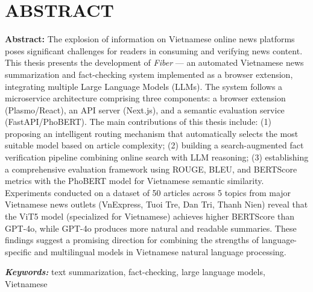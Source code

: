 \chapter*{ABSTRACT}

\textbf{Abstract:} The explosion of information on Vietnamese online news platforms poses significant challenges for readers in consuming and verifying news content. This thesis presents the development of \textit{Fiber} --- an automated Vietnamese news summarization and fact-checking system implemented as a browser extension, integrating multiple Large Language Models (LLMs). The system follows a microservice architecture comprising three components: a browser extension (Plasmo/React), an API server (Next.js), and a semantic evaluation service (FastAPI/PhoBERT). The main contributions of this thesis include: (1) proposing an intelligent routing mechanism that automatically selects the most suitable model based on article complexity; (2) building a search-augmented fact verification pipeline combining online search with LLM reasoning; (3) establishing a comprehensive evaluation framework using ROUGE, BLEU, and BERTScore metrics with the PhoBERT model for Vietnamese semantic similarity. Experiments conducted on a dataset of 50 articles across 5 topics from major Vietnamese news outlets (VnExpress, Tuoi Tre, Dan Tri, Thanh Nien) reveal that the ViT5 model (specialized for Vietnamese) achieves higher BERTScore than GPT-4o, while GPT-4o produces more natural and readable summaries. These findings suggest a promising direction for combining the strengths of language-specific and multilingual models in Vietnamese natural language processing.

\textit{\textbf{Keywords:}} text summarization, fact-checking, large language models, Vietnamese
